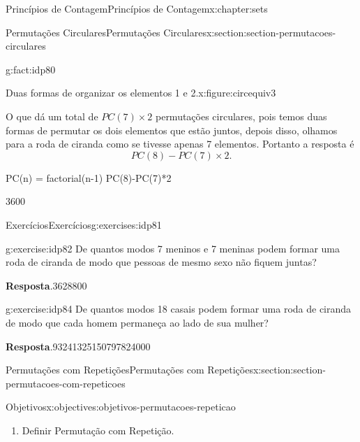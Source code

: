 \documentclass[oneside,10pt,]{book}
\newcommand{\blocktitlefont}{\relax}
\numberwithin{equation}{section}
\begin{document}
\begin{chapterptx}{Princípios de Contagem}{}{Princípios de Contagem}{}{}{x:chapter:sets}
\begin{sectionptx}{Permutações Circulares}{}{Permutações Circulares}{}{}{x:section:section-permutacoes-circulares}
\begin{fact}{}{}{g:fact:idp80}
\begin{figureptx}{Duas formas de organizar os elementos 1 e 2.}{x:figure:circequiv3}{}
\begin{image}{0.1}{0.8}{0.1}
\end{image}%
\tcblower
\end{figureptx}%
O que dá um total de \(PC(7)\times 2\) permutações circulares, pois temos duas formas de permutar os dois elementos que estão juntos, depois disso, olhamos para a roda de ciranda como se tivesse apenas 7 elementos. Portanto a resposta é%
\begin{equation*}
PC(8)-PC(7)\times2. 
\end{equation*}
%
\begin{sageinput}
PC(n) = factorial(n-1)
PC(8)-PC(7)*2
\end{sageinput}
\begin{sageoutput}
3600
\end{sageoutput}
\end{fact}
%
%
\typeout{************************************************}
\typeout{************************************************}
%
\begin{exercises-subsection}{Exercícios}{}{Exercícios}{}{}{g:exercises:idp81}
\begin{divisionexercise}{1}{}{}{g:exercise:idp82}%
De quantos modos 7 meninos e 7 meninas podem formar uma roda de ciranda de modo que pessoas de mesmo sexo não fiquem juntas?%
\par\smallskip%
\noindent\textbf{\blocktitlefont Resposta}.\hypertarget{g:answer:idp83}{}\quad{}3628800%
\end{divisionexercise}%
\begin{divisionexercise}{2}{}{}{g:exercise:idp84}%
De quantos modos 18 casais podem formar uma roda de ciranda de modo que cada homem permaneça ao lado de sua mulher?%
\par\smallskip%
\noindent\textbf{\blocktitlefont Resposta}.\hypertarget{g:answer:idp85}{}\quad{}93241325150797824000%
\end{divisionexercise}%
\end{exercises-subsection}
\end{sectionptx}
%
%
\typeout{************************************************}
\typeout{************************************************}
%
\begin{sectionptx}{Permutações com Repetições}{}{Permutações com Repetições}{}{}{x:section:section-permutacoes-com-repeticoes}
\begin{objectives}{Objetivos}{x:objectives:objetivos-permutacoes-repeticao}
%
\begin{enumerate}
\item{}Definir Permutação com Repetição.%

\end{enumerate}
\end{objectives}
\end{sectionptx}
\end{chapterptx}
\end{document}
